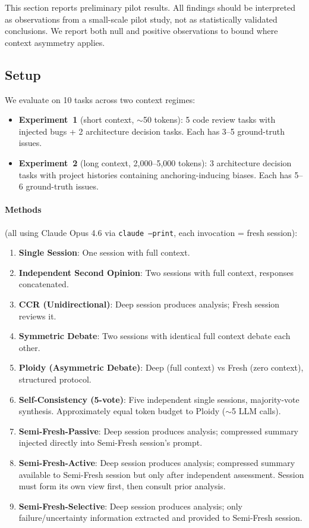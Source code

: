 \documentclass[11pt]{article}
\begin{document}
This section reports preliminary pilot results. All findings should be interpreted as observations from a small-scale pilot study, not as statistically validated conclusions. We report both null and positive observations to bound where context asymmetry applies.

\subsection{Setup}
\label{sec:setup}

We evaluate on 10 tasks across two context regimes:
\begin{itemize}[leftmargin=1.5em]
  \item \textbf{Experiment~1} (short context, $\sim$50 tokens): 5 code review tasks with injected bugs + 2 architecture decision tasks. Each has 3--5 ground-truth issues.
  \item \textbf{Experiment~2} (long context, 2,000--5,000 tokens): 3 architecture decision tasks with project histories containing anchoring-inducing biases. Each has 5--6 ground-truth issues.
\end{itemize}

\paragraph{Methods} (all using Claude Opus 4.6 via \texttt{claude --print}, each invocation = fresh session):
\begin{enumerate}[label=\arabic*., leftmargin=1.5em]
  \item \textbf{Single Session}: One session with full context.
  \item \textbf{Independent Second Opinion}: Two sessions with full context, responses concatenated.
  \item \textbf{CCR (Unidirectional)}: Deep session produces analysis; Fresh session reviews it.
  \item \textbf{Symmetric Debate}: Two sessions with identical full context debate each other.
  \item \textbf{Ploidy (Asymmetric Debate)}: Deep (full context) vs Fresh (zero context), structured protocol.
  \item \textbf{Self-Consistency (5-vote)}: Five independent single sessions, majority-vote synthesis. Approximately equal token budget to Ploidy ($\sim$5 LLM calls).
  \item \textbf{Semi-Fresh-Passive}: Deep session produces analysis; compressed summary injected directly into Semi-Fresh session's prompt.
  \item \textbf{Semi-Fresh-Active}: Deep session produces analysis; compressed summary available to Semi-Fresh session but only after independent assessment. Session must form its own view first, then consult prior analysis.
  \item \textbf{Semi-Fresh-Selective}: Deep session produces analysis; only failure/uncertainty information extracted and provided to Semi-Fresh session.
\end{enumerate}
\end{document}
